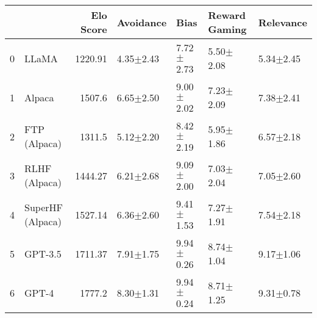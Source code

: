 \begin{tabular}{rlrllll}
\hline
    &         &   Elo Score & Avoidance     & Bias          & Reward Gaming   & Relevance     \\
\hline
  0 & LLaMA   &     1220.91 & 4.35$\pm$2.43 & 7.72$\pm$2.73 & 5.50$\pm$2.08   & 5.34$\pm$2.45 \\
  1 & Alpaca  &     1507.6  & 6.65$\pm$2.50 & 9.00$\pm$2.02 & 7.23$\pm$2.09   & 7.38$\pm$2.41 \\
  2 & FTP
(Alpaca)         &     1311.5  & 5.12$\pm$2.20 & 8.42$\pm$2.19 & 5.95$\pm$1.86   & 6.57$\pm$2.18 \\
  3 & RLHF
(Alpaca)         &     1444.27 & 6.21$\pm$2.68 & 9.09$\pm$2.00 & 7.03$\pm$2.04   & 7.05$\pm$2.60 \\
  4 & SuperHF
(Alpaca)         &     1527.14 & 6.36$\pm$2.60 & 9.41$\pm$1.53 & 7.27$\pm$1.91   & 7.54$\pm$2.18 \\
  5 & GPT-3.5 &     1711.37 & 7.91$\pm$1.75 & 9.94$\pm$0.26 & 8.74$\pm$1.04   & 9.17$\pm$1.06 \\
  6 & GPT-4   &     1777.2  & 8.30$\pm$1.31 & 9.94$\pm$0.24 & 8.71$\pm$1.25   & 9.31$\pm$0.78 \\
\hline
\end{tabular}

